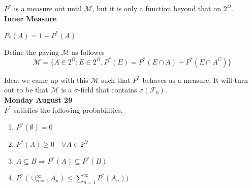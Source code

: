 \documentclass[11pt,fleqn]{book} %
\begin{document}
	$P^*$ is a measure out until $\mathscr{M}$, but it is only a function beyond that on $2^\Omega$.\\

\textbf{Inner Measure}

$P_*(A) = 1 - P^*(A)$ 

\vspace{5mm}

Define the paving $\mathscr{M}$ as followes
$$\mathscr{M} = \{ A \in 2^\Omega:
		E \in 2^\Omega,
		P^*(E) = P^*(E\cap A) + P^*(E \cap A^C) \}$$

	Idea: we came up with this $\mathscr{M}$ such that $P^*$ behaves as a measure. It will turn out to be that $\mathscr{M}$ is a $\sigma$-field that contains $\sigma(\mathscr{F}_0)$.\\

\textbf{Monday August 29}\\

$P^*$ satisfies the following probabilities:

\begin{enumerate}[label = (\roman*)]
	\item $P^*(\emptyset) = 0$
	\item $P^*(A) \geq 0 \quad \forall A \in 2^\Omega$
	\item $A \subseteq B \Rightarrow P^*(A) \subseteq P^*(B)$
	\item $P^*(\cup^\infty_{n=1} A_n) \leq \displaystyle \sum^\infty_{n=1} P^*(A_n))$
\end{enumerate}
\end{document}
